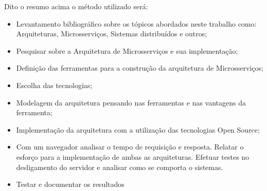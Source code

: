 Dito o resumo acima o método utilizado será:
 \begin{itemize}
     \item Levantamento bibliográfico sobre os tópicos abordados neste trabalho como: Arquiteturas, Microsserviços, Sistemas distribuídos e outros;
     \item Pesquisar sobre a Arquitetura de Microsserviços  e sua implementação;
     \item Definição das ferramentas para a construção da arquitetura de Microsserviços;
     \item Escolha das tecnologias;
     \item Modelagem da arquitetura pensando nas ferramentas e nas vantagens da ferramenta;
     \item Implementação da arquitetura com a utilização das tecnologias Open Source;
     \item Com um navegador analisar o tempo de requisição e resposta. Relatar o esforço para a implementação de ambas as arquiteturas. Efetuar testes no desligamento do servidor e analisar como se comporta o sistemas.
     \item Testar e documentar os resultados
 \end{itemize}
